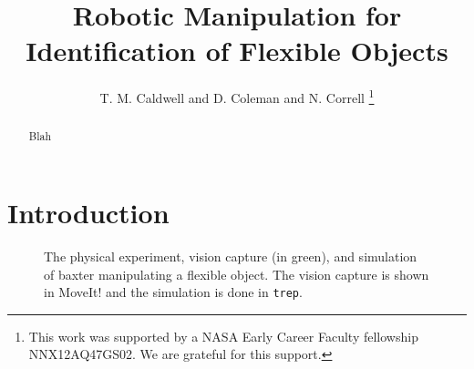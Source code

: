\documentclass[runningheads,a4paper]{llncs}
\begin{document}
\mainmatter  %

\title{Robotic Manipulation for Identification of Flexible Objects}



\author{T. M. Caldwell and  D. Coleman and N. Correll%
\thanks{
This work was supported by a NASA
Early Career Faculty fellowship NNX12AQ47GS02. We are grateful for this support.}%
}
%


\maketitle

\begin{abstract}
Blah
\end{abstract}

\section{Introduction}

\begin{figure}[!htb]
\centering
\def\svgwidth{.95\textwidth}%

\caption{The physical experiment, vision capture (in green), and simulation of baxter manipulating a flexible object. The vision capture is shown in MoveIt! and the simulation is done in \texttt{trep}.}
\label{fig-baxter_y}
\end{figure}
\end{document}
